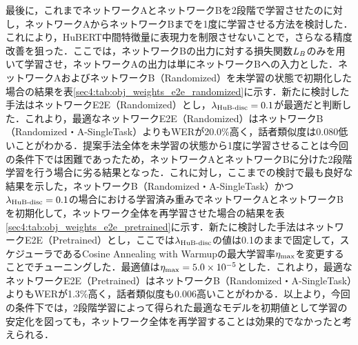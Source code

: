 最後に，これまでネットワークAとネットワークBを2段階で学習させたのに対し，ネットワークAからネットワークBまでを1度に学習させる方法を検討した．これにより，HuBERT中間特徴量に表現力を制限させないことで，さらなる精度改善を狙った．ここでは，ネットワークBの出力に対する損失関数$L_{B}$のみを用いて学習させ，ネットワークAの出力は単にネットワークBへの入力とした．ネットワークAおよびネットワークB（Randomized）を未学習の状態で初期化した場合の結果を表\ref{sec4:tab:obj_weights_e2e_randomized}に示す．新たに検討した手法はネットワークE2E（Randomized）とし，$\lambda_{\text{HuB-disc}} = 0.1$が最適だと判断した．これより，最適なネットワークE2E（Randomized）はネットワークB（Randomized・A-SingleTask）よりもWERが20.0\%高く，話者類似度は0.080低いことがわかる．提案手法全体を未学習の状態から1度に学習させることは今回の条件下では困難であったため，ネットワークAとネットワークBに分けた2段階学習を行う場合に劣る結果となった．これに対し，ここまでの検討で最も良好な結果を示した，ネットワークB（Randomized・A-SingleTask）かつ$\lambda_{\text{HuB-disc}} = 0.1$の場合における学習済み重みでネットワークAとネットワークBを初期化して，ネットワーク全体を再学習させた場合の結果を表\ref{sec4:tab:obj_weights_e2e_pretrained}に示す．新たに検討した手法はネットワークE2E（Pretrained）とし，ここでは$\lambda_{\text{HuB-disc}}$の値は0.1のままで固定して，スケジューラであるCosine Annealing with Warmupの最大学習率$\eta_{\text{max}}$を変更することでチューニングした．最適値は$\eta_{\text{max}} = 5.0 \times 10^{-5}$とした．これより，最適なネットワークE2E（Pretrained）はネットワークB（Randomized・A-SingleTask）よりもWERが1.3\%高く，話者類似度も0.006高いことがわかる．以上より，今回の条件下では，2段階学習によって得られた最適なモデルを初期値として学習の安定化を図っても，ネットワーク全体を再学習することは効果的でなかったと考えられる．

